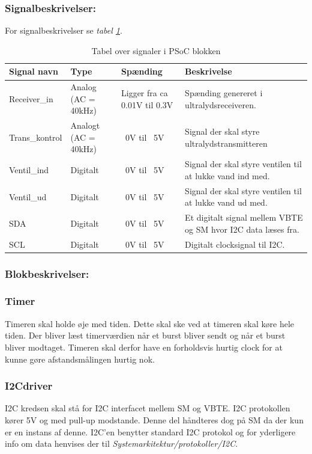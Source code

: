 \subsubsection{Signalbeskrivelser:}
For signalbeskrivelser se \textit{tabel \ref{table:PSoCSignaler}}.
\begin{table}[H]
\begin{tabular}{|p{3cm}|p{3cm}|p{3cm}|p{4.5cm}|} \hline
\cellcolor[gray]{0.85}Signal navn& \cellcolor[gray]{0.85}Type &\cellcolor[gray]{0.85}Spænding&\cellcolor[gray]{0.85}Beskrivelse\\ \hline
Receiver\_in & Analog (AC = 40kHz) & Ligger fra ca 0.01V til 0.3V & Spænding genereret i ultralydsreceiveren.\\ \hline
Trans\_kontrol & Analogt (AC = 40kHz) & ~0V til ~5V & Signal der skal styre ultralydstransmitteren \\ \hline
Ventil\_ind & Digitalt & ~0V til ~5V & Signal der skal styre ventilen til at lukke vand ind med.\\ \hline
Ventil\_ud & Digitalt & ~0V til ~5V & Signal der skal styre ventilen til at lukke vand ud med.\\ \hline
SDA & Digitalt & ~0V til ~5V & Et digitalt signal mellem VBTE og SM hvor I2C data læses fra.\\ \hline
SCL & Digitalt & ~0V til ~5V & Digitalt clocksignal til I2C.\\ \hline
\end{tabular}
\caption{Tabel over signaler i PSoC blokken}
\label{table:PSoCSignaler}
\end{table}
\subsubsection{Blokbeskrivelser:}
\subsubsection{Timer}
Timeren skal holde øje med tiden. Dette skal ske ved at timeren skal køre hele tiden. Der bliver læst timerværdien når et burst bliver sendt og når et burst bliver modtaget. Timeren skal derfor have en forholdsvis hurtig clock for at kunne gøre afstandsmålingen hurtig nok.
\subsubsection{I2Cdriver}
I2C kredsen skal stå for I2C interfacet mellem SM og VBTE. I2C protokollen kører 5V og med pull-up modstande. Denne del håndteres dog på SM da der kun er en instans af denne. I2C'en benytter standard I2C protokol og for yderligere info om data henvises der til \textit{Systemarkitektur/protokoller/I2C}.
